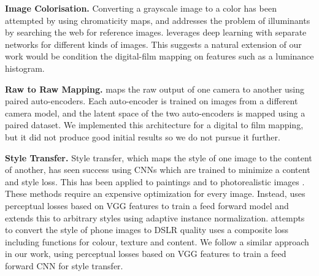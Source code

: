 \noindent\textbf{Image Colorisation.} Converting a grayscale image to a color has been attempted by \cite{large-scale-colorisation} using chromaticity maps, and \cite{intrinsic-colorisation} addresses the problem of illuminants by searching the web for reference images. \cite{deep-colorisation} leverages deep learning with separate networks for different kinds of images. This suggests a natural extension of our work would be condition the digital-film mapping on features such as a luminance histogram.

\noindent\textbf{Raw to Raw Mapping.} \cite{raw-to-raw} maps the raw output of one camera to another using paired auto-encoders. Each auto-encoder is trained on images from a different camera model, and the latent space of the two auto-encoders is mapped using a paired dataset. We implemented this architecture for a digital to film mapping, but it did not produce good initial results so we do not pursue it further.

\noindent\textbf{Style Transfer.} Style transfer, which maps the style of one image to the content of another, has seen success using CNNs which are trained to minimize a content and style loss. This has been applied to paintings \cite{image-style-transfer, scaling-painting-style-transfer} and to photorealistic images \cite{deep-photo-style-transfer}. These methods require an expensive optimization for every image. Instead, \cite{resolution-perceptual-losses} uses perceptual losses based on VGG features to train a feed forward model and \cite{arbitrary-style-transfer} extends this to arbitrary styles using adaptive instance normalization. \cite{dslr-quality} attempts to convert the style of phone images to DSLR quality uses a composite loss including functions for colour, texture and content. We follow a similar approach in our work, using perceptual losses based on VGG features to train a feed forward CNN for style transfer.




